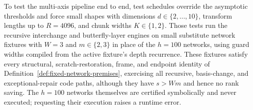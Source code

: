 To test the multi-axis pipeline end to end, test schedules override the asymptotic thresholds and force small shapes with dimensions $d\in\{2,\dots,10\}$, transform lengths up to $R=4096$, and chunk widths $K\in\{1,2\}$. Those tests run the recursive interchange and butterfly-layer engines on small substitute network fixtures with $W=3$ and $m\in\{2,3\}$ in place of the $h=100$ networks, using guard widths compiled from the active fixture's depth recurrence. These fixtures satisfy every structural, scratch-restoration, frame, and endpoint identity of Definition~\ref{def:fixed-network-premises}, exercising all recursive, basis-change, and exceptional-repair code paths, although they have $s>Wm$ and hence no rank saving. The $h=100$ networks themselves are certified symbolically and never executed; requesting their execution raises a runtime error.

